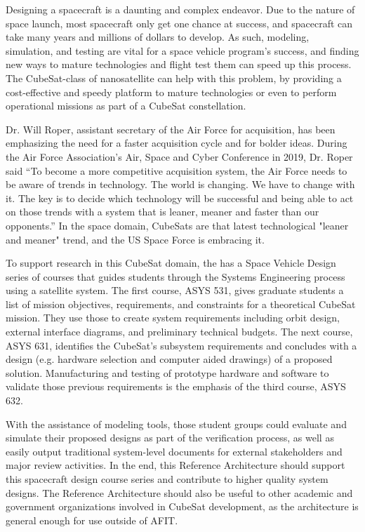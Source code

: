 


Designing a spacecraft is a daunting and complex endeavor. Due to the nature of space launch, most spacecraft only get one chance at success, and spacecraft can take many years and millions of dollars to develop. As such, modeling, simulation, and testing are vital for a space vehicle program's success, and finding new ways to mature technologies and flight test them can speed up this process. The CubeSat-class of nanosatellite can help with this problem, by providing a cost-effective and speedy platform to mature technologies or even to perform operational missions as part of a CubeSat constellation. 

Dr. Will Roper, assistant secretary of the Air Force for acquisition, has been emphasizing the need for a faster acquisition cycle and for bolder ideas. During the Air Force Association’s Air, Space and Cyber Conference in 2019, Dr. Roper said “To become a more competitive acquisition system, the Air Force needs to be aware of trends in technology. The world is changing. We have to change with it. The key is to decide which technology will be successful and being able to act on those trends with a system that is leaner, meaner and faster than our opponents.” \citep{Roper2019} In the space domain, CubeSats are that latest technological "leaner and meaner" trend, and the US Space Force is embracing it. 

To support research in this CubeSat domain, the  has a Space Vehicle Design series of courses that guides students through the Systems Engineering process using a satellite system. The first course, ASYS 531, gives graduate students a list of mission objectives, requirements, and constraints for a theoretical CubeSat mission. They use those to create system requirements including orbit design, external interface diagrams, and preliminary technical budgets. The next course, ASYS 631, identifies the CubeSat’s subsystem requirements and concludes with a design (e.g. hardware selection and computer aided drawings) of a proposed solution. Manufacturing and testing of prototype hardware and software to validate those previous requirements is the emphasis of the third course, ASYS 632.

With the assistance of modeling tools, those student groups could evaluate and simulate their proposed designs as part of the verification process, as well as easily output traditional system-level documents for external stakeholders and major review activities. In the end, this Reference Architecture should support this spacecraft design course series and contribute to higher quality system designs. The Reference Architecture should also be useful to other academic and government organizations involved in CubeSat development, as the architecture is general enough for use outside of AFIT. 

